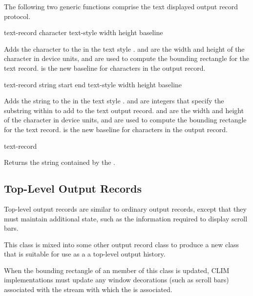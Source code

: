 The following two generic functions comprise the text displayed output record
protocol.

 {text-record character text-style 
                                                   width height baseline}

Adds the character  to the 
 in the text style .   and
 are the width and height of the character in device units, and are
used to compute the bounding rectangle for the text record.   is
the new baseline for characters in the output record.

 {text-record string start end text-style 
                                                width height baseline}

Adds the string  to the 
 in the text style .   and 
are integers that specify the substring within  to add to the text
output record.   and  are the width and height of the
character in device units, and are used to compute the bounding rectangle for
the text record.   is the new baseline for characters in the
output record.

 {text-record}

Returns the string contained by the 
.
\ReadOnly


\subsection {Top-Level Output Records}

Top-level output records are similar to ordinary output records, except that
they must maintain additional state, such as the information required to display
scroll bars.


This class is mixed into some other output record class to produce a new class
that is suitable for use as a a top-level output history.

When the bounding rectangle of an member of this class is updated, CLIM
implementations must update any window decorations (such as scroll bars)
associated with the stream with which the   is
associated.


